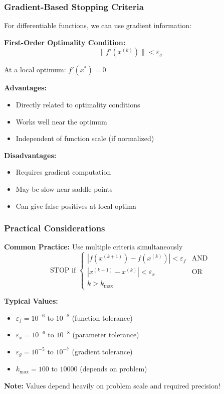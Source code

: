 \documentclass{beamer}
\begin{document}
\begin{frame}
\frametitle{Gradient-Based Stopping Criteria}
For differentiable functions, we can use gradient information:

\vspace{0.3cm}

\textbf{First-Order Optimality Condition:}
$$\|f'(x^{(k)})\| < \varepsilon_g$$

At a local optimum: $f'(x^*) = 0$

\vspace{0.5cm}

\textbf{Advantages:}
\begin{itemize}
    \item Directly related to optimality conditions
    \item Works well near the optimum
    \item Independent of function scale (if normalized)
\end{itemize}

\vspace{0.3cm}

\textbf{Disadvantages:}
\begin{itemize}
    \item Requires gradient computation
    \item May be slow near saddle points
    \item Can give false positives at local optima
\end{itemize}
\end{frame}

\begin{frame}
\frametitle{Practical Considerations}
\textbf{Common Practice:} Use multiple criteria simultaneously
$$\text{STOP if } \begin{cases}
|f(x^{(k+1)}) - f(x^{(k)})| < \varepsilon_f & \text{AND} \\
|x^{(k+1)} - x^{(k)}| < \varepsilon_x & \text{OR} \\
k > k_{\max}
\end{cases}$$

\vspace{0.5cm}

\textbf{Typical Values:}
\begin{itemize}
    \item $\varepsilon_f = 10^{-6}$ to $10^{-8}$ (function tolerance)
    \item $\varepsilon_x = 10^{-6}$ to $10^{-8}$ (parameter tolerance)
    \item $\varepsilon_g = 10^{-5}$ to $10^{-7}$ (gradient tolerance)
    \item $k_{\max} = 100$ to $10000$ (depends on problem)
\end{itemize}

\vspace{0.3cm}

\textbf{Note:} Values depend heavily on problem scale and required precision!
\end{frame}
\end{document}

